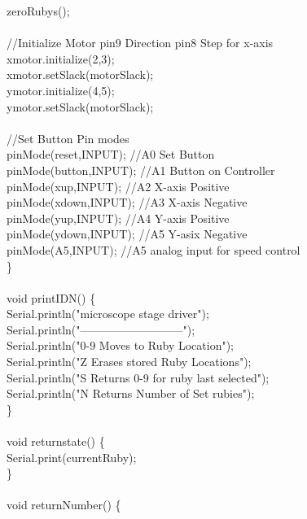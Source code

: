 {\tabto*{.5cm} zeroRubys();\\
\\	
\tabto*{.5cm} //Initialize Motor pin9 Direction pin8 Step for x-axis\\
\tabto*{.5cm} xmotor.initialize(2,3);\\
\tabto*{.5cm} xmotor.setSlack(motorSlack);\\
\tabto*{.5cm} ymotor.initialize(4,5);\\
\tabto*{.5cm} ymotor.setSlack(motorSlack);\\
\\	
\tabto*{.5cm} //Set Button Pin modes\\
\tabto*{.5cm} pinMode(reset,INPUT);\tabto*{7.5cm}  //A0 Set Button\\
\tabto*{.5cm} pinMode(button,INPUT);\tabto*{7.5cm}  //A1 Button on Controller\\
\tabto*{.5cm} pinMode(xup,INPUT);\tabto*{7.5cm}  //A2 X-axis Positive\\
\tabto*{.5cm} pinMode(xdown,INPUT);\tabto*{7.5cm}  //A3 X-axis Negative\\
\tabto*{.5cm} pinMode(yup,INPUT);\tabto*{7.5cm}  //A4 Y-axis Positive\\
\tabto*{.5cm} pinMode(ydown,INPUT);\tabto*{7.5cm}  //A5 Y-asix Negative\\
\tabto*{.5cm} pinMode(A5,INPUT);\tabto*{7.5cm}  //A5 analog input for speed control\\	
\}\\
\\
void printIDN() \{\\
\tabto*{.5cm} Serial.println("\tgp microscope stage driver");\\
\tabto*{.5cm} Serial.println("---------------------------");\\
\tabto*{.5cm} Serial.println("0-9 Moves to Ruby Location");\\
\tabto*{.5cm} Serial.println("Z Erases stored Ruby Locations");\\
\tabto*{.5cm} Serial.println("S Returns 0-9 for ruby last selected");\\
\tabto*{.5cm} Serial.println("N Returns Number of Set rubies");\\
\}\\
\\
void returnstate() \{\\	
\tabto*{.5cm} Serial.print(currentRuby);\\	
\}\\
\\
void returnNumber() \{\\
}

